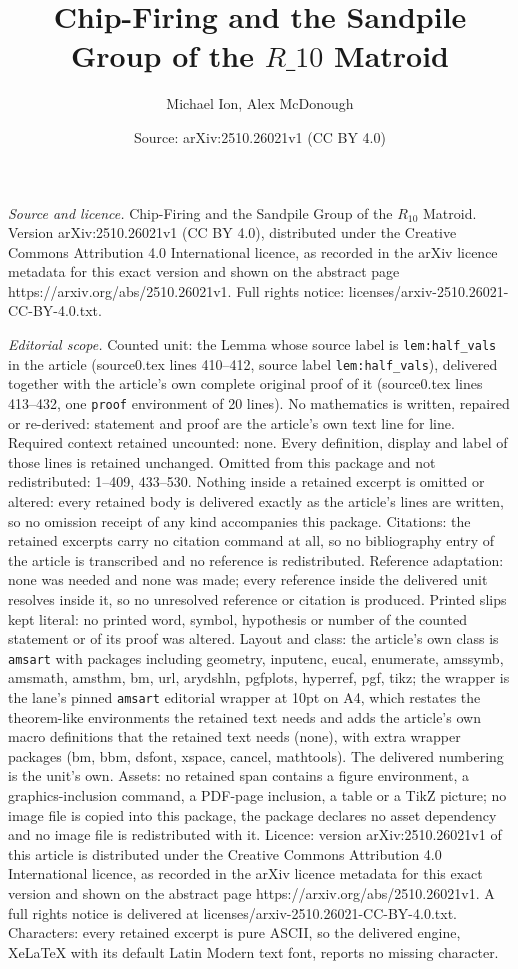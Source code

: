 \documentclass[10pt,a4paper]{amsart}
\title[Chip-Firing and the Sandpile Group of the $R\_{10}$ Matroid]{Chip-Firing and the Sandpile Group of the $R\_{10}$ Matroid}
\author{Michael Ion, Alex McDonough}
\date{Source: arXiv:2510.26021v1 (CC BY 4.0)}
\begin{document}
\maketitle

\noindent\emph{Source and licence.} Chip-Firing and the Sandpile Group of the $R_{10}$ Matroid. Version arXiv:2510.26021v1 (CC BY 4.0), distributed under the Creative Commons Attribution 4.0 International licence, as recorded in the arXiv licence metadata for this exact version and shown on the abstract page https://arxiv.org/abs/2510.26021v1. Full rights notice: licenses/arxiv-2510.26021-CC-BY-4.0.txt.\par\smallskip

\noindent\textit{Editorial scope.} Counted unit: the Lemma whose source label is \texttt{lem:half\_vals} in the article (source0.tex lines 410--412, source label \texttt{lem:half\_vals}), delivered together with the article's own complete original proof of it (source0.tex lines 413--432, one \texttt{proof} environment of 20 lines). No mathematics is written, repaired or re-derived: statement and proof are the article's own text line for line. Required context retained uncounted: none. Every definition, display and label of those lines is retained unchanged. Omitted from this package and not redistributed: 1--409, 433--530. Nothing inside a retained excerpt is omitted or altered: every retained body is delivered exactly as the article's lines are written, so no omission receipt of any kind accompanies this package. Citations: the retained excerpts carry no citation command at all, so no bibliography entry of the article is transcribed and no reference is redistributed. Reference adaptation: none was needed and none was made; every reference inside the delivered unit resolves inside it, so no unresolved reference or citation is produced. Printed slips kept literal: no printed word, symbol, hypothesis or number of the counted statement or of its proof was altered. Layout and class: the article's own class is \texttt{amsart} with packages including geometry, inputenc, eucal, enumerate, amssymb, amsmath, amsthm, bm, url, arydshln, pgfplots, hyperref, pgf, tikz; the wrapper is the lane's pinned \texttt{amsart} editorial wrapper at 10pt on A4, which restates the theorem-like environments the retained text needs and adds the article's own macro definitions that the retained text needs (none), with extra wrapper packages (bm, bbm, dsfont, xspace, cancel, mathtools). The delivered numbering is the unit's own. Assets: no retained span contains a figure environment, a graphics-inclusion command, a PDF-page inclusion, a table or a TikZ picture; no image file is copied into this package, the package declares no asset dependency and no image file is redistributed with it. Licence: version arXiv:2510.26021v1 of this article is distributed under the Creative Commons Attribution 4.0 International licence, as recorded in the arXiv licence metadata for this exact version and shown on the abstract page https://arxiv.org/abs/2510.26021v1. A full rights notice is delivered at licenses/arxiv-2510.26021-CC-BY-4.0.txt. Characters: every retained excerpt is pure ASCII, so the delivered engine, XeLaTeX with its default Latin Modern text font, reports no missing character.
\end{document}
